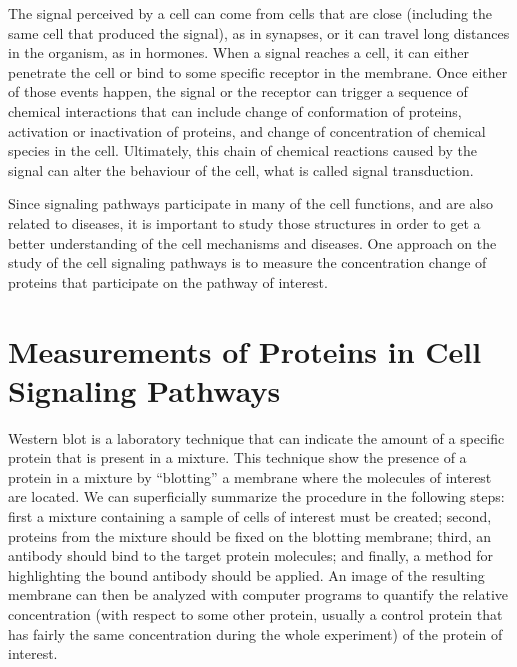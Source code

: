 The signal perceived by a cell can come from cells that are close 
(including the same cell that produced the signal), as in synapses, or 
it can travel long distances in the organism, as in hormones. When a 
signal reaches a cell, it can either penetrate the cell or bind to some 
specific receptor in the membrane. Once either of those events happen, 
the signal or the receptor can trigger a sequence of chemical 
interactions that can include change of conformation of proteins, 
activation or inactivation of proteins, and change of concentration of
chemical species in the cell. Ultimately, this chain of chemical 
reactions caused by the signal can alter the behaviour of the cell, what 
is called signal transduction.

Since signaling pathways participate in many of the cell functions, and 
are also related to diseases, it is important to study those structures
in order to get a better understanding of the cell mechanisms and 
diseases. One approach on the study of the cell signaling pathways is to 
measure the concentration change of proteins that participate on the 
pathway of interest.

\section{Measurements of Proteins in Cell Signaling Pathways}
Western blot is a laboratory technique that can indicate the amount of a
specific protein that is present in a mixture. This technique show the 
presence of a protein in a mixture by ``blotting'' a membrane where the 
molecules of interest are located. We can superficially summarize the 
procedure in the following steps: first a mixture containing a sample of 
cells of interest must be created; second, proteins from the mixture 
should be fixed on the blotting membrane; third, an antibody should bind 
to the target protein molecules; and finally, a method for highlighting 
the bound antibody should be applied. An image of the resulting membrane 
can then be analyzed with computer programs to quantify the relative 
concentration (with respect to some other protein, usually a control 
protein that has fairly the same concentration during the whole 
experiment) of the protein of interest.

